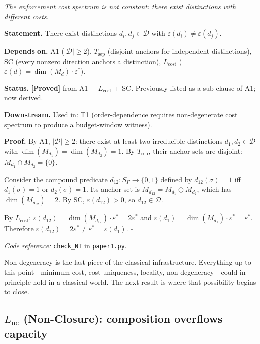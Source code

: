 \documentclass[11pt]{article}
\theoremstyle{remark}
\newcommand{\coderef}[2]{\smallskip\noindent\textit{Code reference:} \texttt{#1} in \texttt{#2}.}
\begin{document}
\begin{tcolorbox}[apfbox, title={Theorem NT (Non-Degeneracy) --- Proof}]
\textit{The enforcement cost spectrum is not constant: there exist distinctions with different costs.}

\smallskip\noindent\textbf{Statement.}  There exist distinctions $d_i, d_j \in \mathcal{D}$ with $\varepsilon(d_i) \ne \varepsilon(d_j)$.

\smallskip\noindent\textbf{Depends on.}  A1 ($|\mathcal{D}| \ge 2$), $T_{\mathrm{sep}}$ (disjoint anchors for independent distinctions), SC (every nonzero direction anchors a distinction), $L_{\mathrm{cost}}$ ($\varepsilon(d) = \dim(M_d) \cdot \varepsilon^*$).

\smallskip\noindent\textbf{Status.}  \textbf{[Proved]} from A1 + $L_{\mathrm{cost}}$ + SC.  Previously listed as a sub-clause of A1; now derived.

\smallskip\noindent\textbf{Downstream.}  Used in: T1 (order-dependence requires non-degenerate cost spectrum to produce a budget-window witness).

\smallskip\noindent\textbf{Proof.}  By A1, $|\mathcal{D}| \ge 2$: there exist at least two irreducible distinctions $d_1, d_2 \in \mathcal{D}$ with $\dim(M_{d_1}) = \dim(M_{d_2}) = 1$.  By $T_{\mathrm{sep}}$, their anchor sets are disjoint: $M_{d_1} \cap M_{d_2} = \{0\}$.

Consider the compound predicate $d_{12}: S_\Gamma \to \{0,1\}$ defined by $d_{12}(\sigma) = 1$ iff $d_1(\sigma) = 1$ or $d_2(\sigma) = 1$.  Its anchor set is $M_{d_{12}} = M_{d_1} \oplus M_{d_2}$, which has $\dim(M_{d_{12}}) = 2$.  By SC, $\varepsilon(d_{12}) > 0$, so $d_{12} \in \mathcal{D}$.

By $L_{\mathrm{cost}}$: $\varepsilon(d_{12}) = \dim(M_{d_{12}}) \cdot \varepsilon^* = 2\varepsilon^*$ and $\varepsilon(d_1) = \dim(M_{d_1}) \cdot \varepsilon^* = \varepsilon^*$.  Therefore $\varepsilon(d_{12}) = 2\varepsilon^* \ne \varepsilon^* = \varepsilon(d_1)$.  \hfill$\square$

\coderef{check\_NT}{paper1.py}
\end{tcolorbox}

\smallskip\noindent Non-degeneracy is the last piece of the classical infrastructure.  Everything up to this point---minimum cost, cost uniqueness, locality, non-degeneracy---could in principle hold in a classical world.  The next result is where that possibility begins to close.

\subsection{\texorpdfstring{$L_{\mathrm{nc}}$}{L nc} (Non-Closure): composition overflows capacity}
\label{sec:L_nc}
\end{document}
